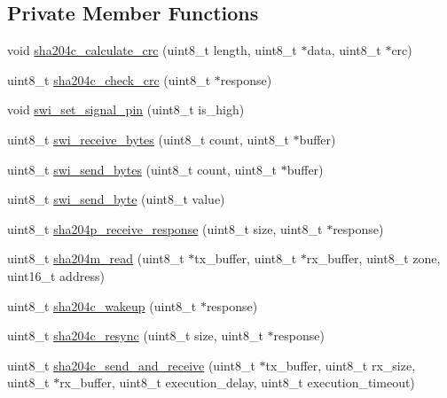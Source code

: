 \subsection*{Private Member Functions}
\begin{DoxyCompactItemize}
\item 
void \hyperlink{classATSHA204Class_a42b8beceec64c89148a9bb49b26f0fb1}{sha204c\+\_\+calculate\+\_\+crc} (uint8\+\_\+t length, uint8\+\_\+t $\ast$data, uint8\+\_\+t $\ast$crc)
\item 
uint8\+\_\+t \hyperlink{classATSHA204Class_a30b1fad66d47a88848ebc6d74b66ec97}{sha204c\+\_\+check\+\_\+crc} (uint8\+\_\+t $\ast$response)
\item 
void \hyperlink{classATSHA204Class_a2d69316e4670b7fd17a1e2b6231191ff}{swi\+\_\+set\+\_\+signal\+\_\+pin} (uint8\+\_\+t is\+\_\+high)
\item 
uint8\+\_\+t \hyperlink{classATSHA204Class_ae81c8e3063da186b698d31bad70e543b}{swi\+\_\+receive\+\_\+bytes} (uint8\+\_\+t count, uint8\+\_\+t $\ast$buffer)
\item 
uint8\+\_\+t \hyperlink{classATSHA204Class_a0f8c2167d152bbe670d1b1187d7b2897}{swi\+\_\+send\+\_\+bytes} (uint8\+\_\+t count, uint8\+\_\+t $\ast$buffer)
\item 
uint8\+\_\+t \hyperlink{classATSHA204Class_abe55ac783f1a37777bd09b7fc369ebc9}{swi\+\_\+send\+\_\+byte} (uint8\+\_\+t value)
\item 
uint8\+\_\+t \hyperlink{classATSHA204Class_ae5c777e2388de999d13afef7008a36a7}{sha204p\+\_\+receive\+\_\+response} (uint8\+\_\+t size, uint8\+\_\+t $\ast$response)
\item 
uint8\+\_\+t \hyperlink{classATSHA204Class_a6bcaa1359ac7392ed066641323fe8d5d}{sha204m\+\_\+read} (uint8\+\_\+t $\ast$tx\+\_\+buffer, uint8\+\_\+t $\ast$rx\+\_\+buffer, uint8\+\_\+t zone, uint16\+\_\+t address)
\item 
uint8\+\_\+t \hyperlink{classATSHA204Class_a2772385d612dee11f65c310334d7952b}{sha204c\+\_\+wakeup} (uint8\+\_\+t $\ast$response)
\item 
uint8\+\_\+t \hyperlink{classATSHA204Class_a0d8eab6a8af231835dd5b6734df0d670}{sha204c\+\_\+resync} (uint8\+\_\+t size, uint8\+\_\+t $\ast$response)
\item 
uint8\+\_\+t \hyperlink{classATSHA204Class_a3689222ad46022e5c50ba484053d9b2c}{sha204c\+\_\+send\+\_\+and\+\_\+receive} (uint8\+\_\+t $\ast$tx\+\_\+buffer, uint8\+\_\+t rx\+\_\+size, uint8\+\_\+t $\ast$rx\+\_\+buffer, uint8\+\_\+t execution\+\_\+delay, uint8\+\_\+t execution\+\_\+timeout)
\end{DoxyCompactItemize}
